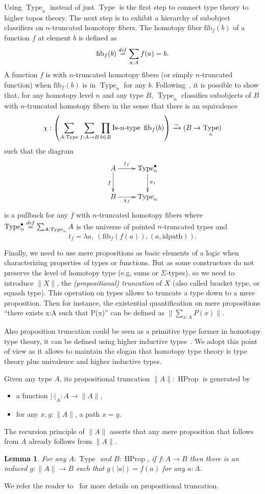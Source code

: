 \documentclass[conference]{IEEEtran}
\newtheorem{lem}[thm]{Lemma}
\newcommand \defeq {\overset{de\hspace{-0.2ex}f}{=}}
\newcommand{\eg}{e.g,\xspace}
\DeclareMathOperator{\Type}{Type}
\DeclareMathOperator{\HProp}{HProp}
\def\mymathhyphen{{\hbox{-}}}
\newcommand{\IsType}[1]
{\mathop{\mathrm{Is\mymathhyphen}#1\mathrm{\mymathhyphen type}} }
\newcommand \squash[1] {\| #1 \| }
\newcommand \fib[2] {\mathrm{fib}_{#1}(#2)}
\begin{document}
Using $\Type_n$ instead of just $\Type$ is the first step to connect
type theory to higher topos theory. The next step is to exhibit a
hierarchy of subobject classifiers on $n$-truncated homotopy fibers.
%
The homotopy fiber $\fib{f}{b}$ of a function $f$ at element $b$ is
defined as 
$$
\fib{f}{b} \defeq \sum_{a:A} f(a) = b.
$$ 
%
A function $f$ is with $n$-truncated homotopy fibers (or simply
$n$-truncated function) when $\fib{f}{b}$
is in $\Type_n$ for any $b$.  
%
Following~\cite{sets_in_hott}, it is possible to show that, for any
homotopy level $n$ and any type $B$, $\Type_n$ classifies subobjects
of $B$ with $n$-truncated homotopy fibers in the sense that there is
an equivalence
%
$$\chi : \left(\sum_{A:\Type} \sum_{f:A \to B} \prod_{b\in B}
\IsType n\
\fib{f}{b}\right) \xrightarrow{\sim} 
 (B \to \Type_n)$$
%
 such that the diagram
$$
\xymatrix{
  A \ar[r]^{\hspace{-1em} t_f} \ar[d]_f & \Type_n^\bullet \ar[d]^{\pi_1}\\
  B \ar[r]_{\hspace{-1em} \chi_f} & \Type_n
}
$$
is a pullback for any $f$ with
 $n$-truncated homotopy fibers where $\Type_n^\bullet \defeq
 \sum_{A:\Type_n} A$ is the universe of pointed
$n$-truncated types and 
$$t_f = \lambda a,~(\fib{f}{f(a)},(a,\mathrm{idpath})).$$

Finally, we need to use mere propositions as basic elements of a logic
when characterizing properties of types or functions. 
%
But as some constructors do not preserve the level of homotopy type
(\eg sums or $\Sigma$-types), so we need to introduce $\squash{X}$, the
{\em (propositional) truncation} of $X$ (also called bracket type, or
squash type). This operation on types allows to truncate a type down
to a mere proposition. Then for instance, the existential
quantification on mere propositions ``there exists x:A such that
P(x)'' can be defined as $ \squash{\sum_{x:A} P(x)}.  $

Also proposition truncation could be seen as a primitive type former
in homotopy type theory, it can be defined using higher inductive
types~\cite{lumsdaine2011higher,lumsdaine2013higher}. We adopt this
point of view as it allows to maintain the slogan that homotopy type
theory is type theory plus univalence and higher inductive types.
%

Given any type $A$, its propositional truncation 
$\squash{A} : \HProp$ is generated by 
\begin{itemize}
\item a function $|\cdot|_A : A \to \squash{A}$,
\item for any $x,y:\squash{A}$, a path $x=y$.
\end{itemize}
% 
The recursion principle of $\squash{A}$  asserts that any mere
proposition that follows from $A$ already follows from $\squash{A}$.
\begin{lem}
  For any $A:\Type$ and $B:\HProp$, if $f:A \to B$ then there is an
  induced $g:\squash{A}\to B$ such that $g(|a|)= f(a)$ for any $a:A$.
\end{lem}
%
We refer the reader to~\cite{hottbook} for more details on propositional truncation.
\end{document}

